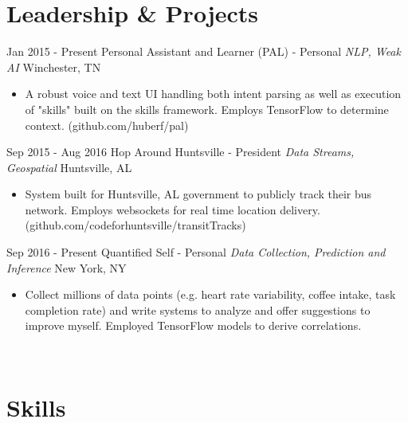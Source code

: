 \documentclass[letterpaper]{moderncv}        %
\begin{document}
    \section{Leadership \& Projects}
\cventry
{Jan 2015 - Present}
{Personal Assistant and Learner (PAL) - Personal}
{}
{\textit{NLP, Weak AI}}
{Winchester, TN}
{\begin{itemize}%
	\item A robust voice and text UI handling both intent parsing as well as execution of "skills" built on the skills framework. Employs TensorFlow to determine context. (github.com/huberf/pal)
\end{itemize}}
\cventry
{Sep 2015 - Aug 2016}
{Hop Around Huntsville - President}
{}
{\textit{Data Streams, Geospatial}}
{Huntsville, AL}
{\begin{itemize}%
\item System built for Huntsville, AL government to publicly track their bus network. Employs websockets for real time location delivery. (github.com/codeforhuntsville/transitTracks)
\end{itemize}}
\cventry
{Sep 2016 - Present}
{Quantified Self - Personal}
{}
{\textit{Data Collection, Prediction and Inference}}
{New York, NY}
{\begin{itemize}%
\item Collect millions of data points (e.g. heart rate variability, coffee intake, task
completion rate) and write systems to analyze and offer suggestions to improve myself. Employed TensorFlow models to derive correlations.
\end{itemize}}
    
\ 
\section{Skills}
\end{document}
